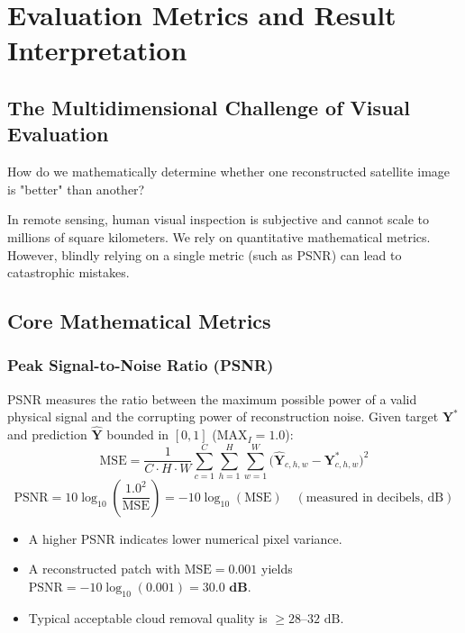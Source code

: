 \chapter{Evaluation Metrics and Result Interpretation}
\label{chap:ch16}

\section{The Multidimensional Challenge of Visual Evaluation}
How do we mathematically determine whether one reconstructed satellite image is "better" than another?

In remote sensing, human visual inspection is subjective and cannot scale to millions of square kilometers. We rely on quantitative mathematical metrics. However, blindly relying on a single metric (such as PSNR) can lead to catastrophic mistakes.

\section{Core Mathematical Metrics}

\subsection{Peak Signal-to-Noise Ratio (PSNR)}
PSNR measures the ratio between the maximum possible power of a valid physical signal and the corrupting power of reconstruction noise. Given target $\mathbf{Y}^*$ and prediction $\hat{\mathbf{Y}}$ bounded in $[0, 1]$ ($\text{MAX}_I = 1.0$):
\begin{equation}
\text{MSE} = \frac{1}{C \cdot H \cdot W} \sum_{c=1}^C \sum_{h=1}^H \sum_{w=1}^W \big( \hat{\mathbf{Y}}_{c,h,w} - \mathbf{Y}^*_{c,h,w} \big)^2
\end{equation}
\begin{equation}
\text{PSNR} = 10 \log_{10}\left( \frac{1.0^2}{\text{MSE}} \right) = -10 \log_{10}(\text{MSE}) \quad (\text{measured in decibels, dB})
\end{equation}
\begin{itemize}
    \item A higher PSNR indicates lower numerical pixel variance.
    \item A reconstructed patch with $\text{MSE} = 0.001$ yields $\text{PSNR} = -10 \log_{10}(0.001) = \mathbf{30.0\text{ dB}}$.
    \item Typical acceptable cloud removal quality is $\ge 28\text{--}32\text{ dB}$.
\end{itemize}


